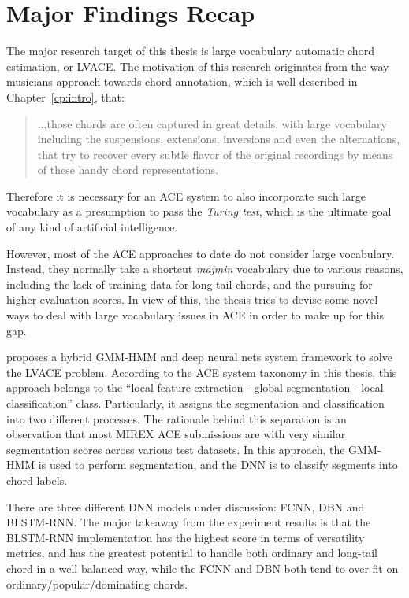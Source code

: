 \section{Major Findings Recap} \label{sec:6-recap}
The major research target of this thesis is large vocabulary automatic chord estimation, or LVACE. The motivation of this research originates from the way musicians approach towards chord annotation, which is well described in Chapter~\ref{cp:intro}, that:
\begin{quote}
...those chords are often captured in great details, with large vocabulary including the suspensions, extensions, inversions and even the alternations, that try to recover every subtle flavor of the original recordings by means of these handy chord representations.
\end{quote}
Therefore it is necessary for an ACE system to also incorporate such large vocabulary as a presumption to pass the \textit{Turing test}, which is the ultimate goal of any kind of artificial intelligence.

However, most of the ACE approaches to date do not consider large vocabulary. Instead, they normally take a shortcut \textit{majmin} vocabulary due to various reasons, including the lack of training data for long-tail chords, and the pursuing for higher evaluation scores. In view of this, the thesis tries to devise some novel ways to deal with large vocabulary issues in ACE in order to make up for this gap.

 proposes a hybrid GMM-HMM and deep neural nets system framework to solve the LVACE problem. According to the ACE system taxonomy in this thesis, this approach belongs to the ``local feature extraction - global segmentation - local classification'' class. Particularly, it assigns the segmentation and classification into two different processes. The rationale behind this separation is an observation that most MIREX ACE submissions are with very similar segmentation scores across various test datasets. In this approach, the GMM-HMM is used to perform segmentation, and the DNN is to classify segments into chord labels.

There are three different DNN models under discussion: FCNN, DBN and BLSTM-RNN. The major takeaway from the experiment results is that the BLSTM-RNN implementation has the highest score in terms of versatility metrics, and has the greatest potential to handle both ordinary and long-tail chord in a well balanced way, while the FCNN and DBN both tend to over-fit on ordinary/popular/dominating chords.

